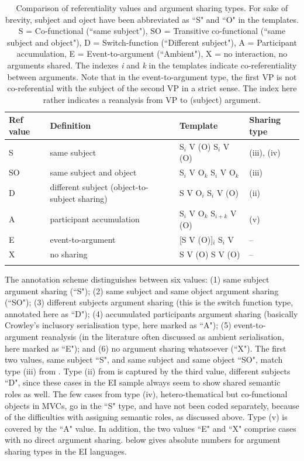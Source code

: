 \begin{table}
\begin{tabular}{l p{4cm} l l}
\lsptoprule
Ref value & Definition & Template & Sharing type \\ 
\midrule 
S & same subject & S$_i$ V (O) S$_i$ V (O) &  (iii), (iv) \\ 
SO & same subject and object & S$_i$ V O$_k$ S$_i$ V O$_k$ & (iii) \\ 
D & different subject (object-to-subject sharing) & S V O$_i$ S$_i$ V (O) & (ii) \\ 
A & participant accumulation & S$_i$ V O$_k$ S$_{i+k}$ V (O) & (v) \\  
E & event-to-argument & [S V (O)]$_i$ S$_i$ V & -- \\ 
X & no sharing & S V (O) S V (O) & -- \\ 
\lspbottomrule 
\end{tabular} 
\caption[Comparison of referentiality and argument sharing types]{Comparison of referentiality values and argument sharing types. For sake of brevity, subject and oject have been abbreviated as ``S" and ``O" in the templates. S = Co-functional (``same subject"), SO = Transitive co-functional (``same subject and object"), D = Switch-function (``Different subject"), A = Participant accumulation, E = Event-to-argument (``Ambient"), X = no interaction, no arguments shared. The indexes \textit{i} and \textit{k} in the templates indicate co-referentiality between arguments. Note that in the event-to-argument type, the first VP is not co-referential with the subject of the second VP in a strict sense. The index here rather indicates a reanalysis from VP to (subject) argument.}
\label{table:comparison_ref-sharing}
\end{table}

The annotation scheme distinguishes between six values: (1) same subject argument sharing (``S"); (2) same subject and same object argument sharing (``SO"); (3) different subjects argument sharing (this is the switch function type, annotated here as ``D"); (4) accumulated participants argument sharing (basically Crowley's inclusory serialisation type, here marked as ``A"); (5) event-to-argument reanalysis (in the literature often discussed as ambient serialisation, here marked as ``E"); and (6) no argument sharing whatsoever (``X"). The first two values, same subject ``S", and same subject and same object ``SO", match type (iii) from . Type (ii) from  is captured by the third value, different subjects ``D", since these cases in the EI sample always seem to show shared semantic roles as well. The few cases from type (iv), hetero-thematical but co-functional objects in MVCs, go in the ``S" type, and have not been coded separately, because of the difficulties with assigning semantic roles, as discussed above. Type (v) is covered by the ``A" value. In addition, the two values ``E" and ``X" comprise cases with no direct argument sharing.  below gives absolute numbers  for argument sharing types in the EI languages.

